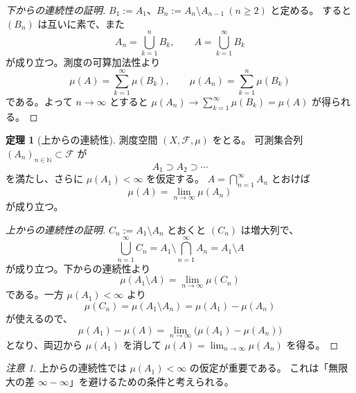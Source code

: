 \documentclass[uplatex]{jsarticle}
\theoremstyle{definition}
\newtheorem{theorem}{定理}[section]
\theoremstyle{remark}
\newtheorem{remark}{注意}[section]
\newcommand{\calF}{\mathcal{F}}
\begin{document}
\begin{proof}[下からの連続性の証明]
$B_1:=A_1$、$B_n:=A_n\setminus A_{n-1}\ (n\ge2)$ と定める。
すると $(B_n)$ は互いに素で、また
\[
  A_n=\bigcup_{k=1}^n B_k,\qquad
  A=\bigcup_{k=1}^\infty B_k
\]
が成り立つ。測度の可算加法性より
\[
  \mu(A)=\sum_{k=1}^\infty \mu(B_k),\qquad
  \mu(A_n)=\sum_{k=1}^n \mu(B_k)
\]
である。よって $n\to\infty$ とすると
$\mu(A_n)\to \sum_{k=1}^\infty \mu(B_k)=\mu(A)$ が得られる。
\end{proof}

\begin{theorem}[上からの連続性]
測度空間 $(X,\calF,\mu)$ をとる。
可測集合列 $(A_n)_{n\in\mathbb{N}}\subset\calF$ が
\[
  A_1\supset A_2\supset \cdots
\]
を満たし、さらに $\mu(A_1)<\infty$ を仮定する。
$A=\bigcap_{n=1}^\infty A_n$ とおけば
\[
  \mu(A)=\lim_{n\to\infty}\mu(A_n)
\]
が成り立つ。
\end{theorem}

\begin{proof}[上からの連続性の証明]
$C_n:=A_1\setminus A_n$ とおくと $(C_n)$ は増大列で、
\[
  \bigcup_{n=1}^\infty C_n = A_1\setminus \bigcap_{n=1}^\infty A_n
  =A_1\setminus A
\]
が成り立つ。下からの連続性より
\[
  \mu(A_1\setminus A)=\lim_{n\to\infty}\mu(C_n)
\]
である。一方 $\mu(A_1)<\infty$ より
\[
  \mu(C_n)=\mu(A_1\setminus A_n)=\mu(A_1)-\mu(A_n)
\]
が使えるので、
\[
  \mu(A_1)-\mu(A)=\lim_{n\to\infty}\bigl(\mu(A_1)-\mu(A_n)\bigr)
\]
となり、両辺から $\mu(A_1)$ を消して
$\mu(A)=\lim_{n\to\infty}\mu(A_n)$ を得る。
\end{proof}

\begin{remark}
上からの連続性では $\mu(A_1)<\infty$ の仮定が重要である。
これは「無限大の差 $\infty-\infty$」を避けるための条件と考えられる。
\end{remark}
\end{document}
